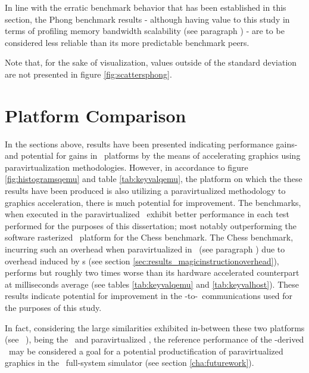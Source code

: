 In line with the erratic benchmark behavior that has been established in this section, the Phong benchmark results - although having value to this study in terms of profiling memory bandwidth scalability (see paragraph ) - are to be considered less reliable than its more predictable benchmark peers.

\noindent
Note that, for the sake of visualization, values outside of the standard deviation are not presented in figure \ref{fig:scattersphong}.




\section{Platform Comparison}
\label{sec:analysisexperiment_platformcomparison}
In the sections above, results have been presented indicating performance gains- and potential for gains in \dvttermsimics\ platforms by the means of accelerating graphics using paravirtualization methodologies.
However, in accordance to figure \ref{fig:histogramsqemu} and table \ref{tab:keyvalqemu}, the platform on which the these results have been produced is also utilizing a paravirtualized methodology to graphics acceleration, there is much potential for improvement.
The benchmarks, when executed in the paravirtualized \dvttermandroidemulator\ exhibit better performance in each test performed for the purposes of this dissertation; most notably outperforming the software rasterized \dvttermsimics\ platform for the Chess benchmark.
The Chess benchmark, incurring such an overhead when paravirtualized in \dvttermsimics\ (see paragraph ) due to overhead induced by \dvttermmagicinstruction s (see section \ref{sec:results_magicinstructionoverhead}), performs but roughly two times worse than its hardware accelerated counterpart at  milliseconds average (see tables \ref{tab:keyvalqemu} and \ref{tab:keyvalhost}).
These results indicate potential for improvement in the \dvttermtarget -to-\dvttermhost\ communications used for the purposes of this study.

In fact, considering the large similarities exhibited in-between these two platforms (see ~), being the \dvttermandroidemulator\ and paravirtualized \dvttermsimics , the reference performance of the \dvttermqemu -derived \dvttermandroidemulator\ may be considered a goal for a potential productification of paravirtualized graphics in the \dvttermsimics\ full-system simulator (see section \ref{cha:futurework}).\\

